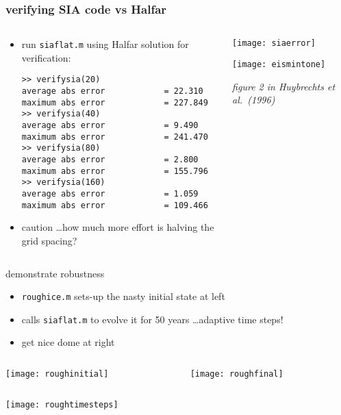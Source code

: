 \begin{frame}[fragile]
\frametitle{verifying SIA code vs Halfar}
\label{slide:verifysia}

\begin{columns}
\begin{column}{0.55\textwidth}
\begin{itemize}
\item run \texttt{siaflat.m} using Halfar solution for verification:
\scriptsize
\begin{verbatim}
>> verifysia(20)
average abs error            = 22.310
maximum abs error            = 227.849
>> verifysia(40)
average abs error            = 9.490
maximum abs error            = 241.470
>> verifysia(80)
average abs error            = 2.800
maximum abs error            = 155.796
>> verifysia(160)
average abs error            = 1.059
maximum abs error            = 109.466
\end{verbatim}
\normalsize

\medskip
\item caution \dots how much more effort is halving the grid spacing?
\end{itemize}
\end{column}
\begin{column}{0.45\textwidth}

\medskip
\texttt{[image: siaerror]}

\bigskip\medskip

\texttt{[image: eismintone]}

\scriptsize \emph{figure 2 in Huybrechts et al.~(1996)}
\end{column}
\end{columns}
\end{frame}


\begin{frame}{demonstrate robustness}

\begin{itemize}
\item \texttt{roughice.m} sets-up the nasty initial state at left
\item calls \texttt{siaflat.m} to evolve it for 50 years \dots adaptive time steps!
\item get nice dome at right
\end{itemize}

\begin{columns}
\begin{column}{0.5\textwidth}
\texttt{[image: roughinitial]}
\end{column}
\begin{column}{0.5\textwidth}
\hfill \texttt{[image: roughfinal]}
\end{column}
\end{columns}

\vspace{-2mm}
\begin{center}
\texttt{[image: roughtimesteps]}
\end{center}
\end{frame}


